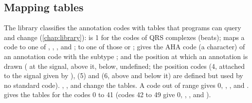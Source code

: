 \subsection{Mapping tables}
\label{sec:formats-maps}

The library classifies the annotation codes with tables that programs can query and change
(\cref{chap:library}):  is 1 for the codes of QRS complexes (beats);
 maps a code to one of , , ,
 and ;  to one of those or ;  gives the AHA
code (a character) of an annotation code with the subtype ; and 
the position at which an annotation is drawn ( at the signal, 
above it,  below,  undefined; the position codes  (4,
attached to the signal given by ),  (5) and  (6, above
and below it) are defined but used by no standard code).
, ,  and  change the tables. A
code out of range gives 0, , ,  and .
 gives the tables for the codes 0 to 41 (codes 42 to 49 give 0,
, ,  and ).

